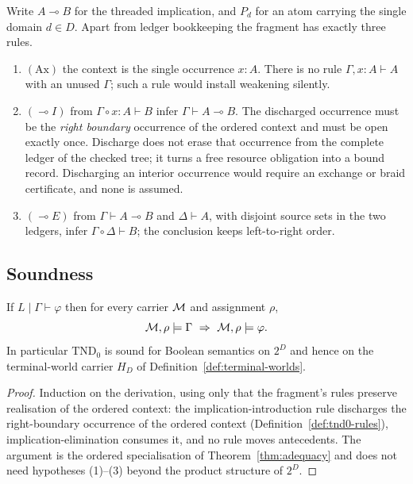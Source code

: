 \begin{definition}\label{def:tnd0-rules}
Write $A\multimap B$ for the threaded implication, and $P_d$ for an atom carrying the single
domain $d\in D$.  Apart from ledger bookkeeping the fragment has exactly three rules.
\begin{enumerate}
\item $(\mathrm{Ax})$ the context is the single occurrence $x:A$.  There is no rule
  $\Gamma,x:A\vdash A$ with an unused $\Gamma$; such a rule would install weakening silently.
\item $(\multimap I)$ from $\Gamma\circ x:A\vdash B$ infer $\Gamma\vdash A\multimap B$.  The
  discharged occurrence must be the \emph{right boundary} occurrence of the ordered context
  and must be open exactly once.  Discharge does not erase that occurrence from the complete
  ledger of the checked tree; it turns a free resource obligation into a bound record.
  Discharging an interior occurrence would require an exchange or braid certificate, and
  none is assumed.
\item $(\multimap E)$ from $\Gamma\vdash A\multimap B$ and $\Delta\vdash A$, with disjoint
  source sets in the two ledgers, infer $\Gamma\circ\Delta\vdash B$; the conclusion keeps
  left-to-right order.
\end{enumerate}
\end{definition}

\subsection{Soundness}

\begin{theorem}\label{thm:soundness}
If $L\mid\Gamma\vdash\varphi$ then for every carrier $\mathcal M$ and assignment $\rho$,
\[
  \cM,\rho\models\Gamma \ \Rightarrow\ \cM,\rho\models\varphi .
\]
In particular $\mathrm{TND}_0$ is sound for Boolean semantics on $2^{D}$ and hence on the
terminal-world carrier $H_D$ of Definition~\ref{def:terminal-worlds}.
\end{theorem}

\begin{proof}
Induction on the derivation, using only that the fragment's rules preserve realisation of
the ordered context: the implication-introduction rule discharges the right-boundary occurrence of the
ordered context (Definition~\ref{def:tnd0-rules}), implication-elimination consumes it, and no rule moves antecedents.  The argument
is the ordered specialisation of Theorem~\ref{thm:adequacy} and does not need hypotheses
(1)--(3) beyond the product structure of $2^{D}$.
\end{proof}

